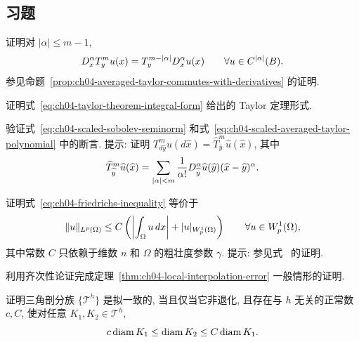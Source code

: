 \subsection*{习题}
\label{sec:ch04-exercises}
\setcounter{exerciseitem}{0}

\begin{MBExercise}
\label{exr:ch04-01}
证明对 $|\alpha|\leq m-1$,
\[
\MathBookFormulaID{formula-ch04-exercise-01-derivative-identity}
D_x^\alpha T_y^m u(x)=T_y^{m-|\alpha|}D_x^\alpha u(x)
\qquad\forall u\in C^{|\alpha|}(B).
\]
参见命题~\ref{prop:ch04-averaged-taylor-commutes-with-derivatives} 的证明.
\end{MBExercise}

\begin{MBExercise}
\label{exr:ch04-02}
证明式~\eqref{eq:ch04-taylor-theorem-integral-form} 给出的 Taylor 定理形式.
\end{MBExercise}

\begin{MBExercise}
\label{exr:ch04-03}
验证式~\eqref{eq:ch04-scaled-sobolev-seminorm} 和式~\eqref{eq:ch04-scaled-averaged-taylor-polynomial} 中的断言. 提示: 证明 $T_{d\widehat y}^m u(d\widehat x)=\widehat T_{\widehat y}^m\widehat u(\widehat x)$, 其中
\[
\MathBookFormulaID{formula-ch04-exercise-03-scaled-taylor-polynomial}
\widehat T_{\widehat y}^m\widehat u(\widehat x)
=\sum_{|\alpha|<m}\frac1{\alpha!}D_{\widehat y}^\alpha\widehat u(\widehat y)
(\widehat x-\widehat y)^\alpha.
\]
\end{MBExercise}

\begin{MBExercise}
\label{exr:ch04-04}
证明式~\eqref{eq:ch04-friedrichs-inequality} 等价于
\[
\MathBookFormulaID{formula-ch04-exercise-04-equivalent-friedrichs}
\|u\|_{L^p(\Omega)}
\leq C\left(\left|\int_\Omega u\,dx\right|+|u|_{W_p^1(\Omega)}\right)
\qquad\forall u\in W_p^1(\Omega),
\]
其中常数 $C$ 只依赖于维数 $n$ 和 $\Omega$ 的粗壮度参数 $\gamma$. 提示: 参见式~ 的证明.
\end{MBExercise}

\begin{MBExercise}
\label{exr:ch04-05}
利用齐次性论证完成定理~\ref{thm:ch04-local-interpolation-error} 一般情形的证明.
\end{MBExercise}

\begin{MBExercise}
\label{exr:ch04-06}
证明三角剖分族 $\{\mathcal T^h\}$ 是拟一致的, 当且仅当它非退化, 且存在与 $h$ 无关的正常数 $c,C$, 使对任意 $K_1,K_2\in\mathcal T^h$,
\[
\MathBookFormulaID{formula-ch04-exercise-06-element-diameter-comparability}
c\operatorname{diam}K_1\leq\operatorname{diam}K_2
\leq C\operatorname{diam}K_1.
\]
\end{MBExercise}

